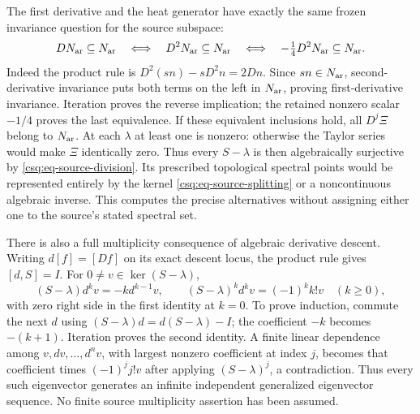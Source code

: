 The first derivative and the heat generator have exactly the same
frozen invariance question for the source subspace:
\begin{equation}\label{csq:eq-source-D-equivalence}
 DN_{\rm ar}\subseteq N_{\rm ar}
 \quad\Longleftrightarrow\quad D^2N_{\rm ar}\subseteq N_{\rm ar}
 \quad\Longleftrightarrow\quad -\tfrac14D^2N_{\rm ar}\subseteq N_{\rm ar}.
\end{equation}
Indeed the product rule is
$D^2(sn)-sD^2n=2Dn$. Since $sn\in N_{\rm ar}$, second-derivative
invariance puts both terms on the left in $N_{\rm ar}$, proving
first-derivative invariance. Iteration proves the reverse implication;
the retained nonzero scalar $-1/4$ proves the last equivalence.
If these equivalent inclusions hold, all $D^j\Xi$ belong to
$N_{\rm ar}$. At each $\lambda$ at least one is nonzero: otherwise
the Taylor series would make $\Xi$ identically zero. Thus every
$S-\lambda$ is then algebraically surjective by
\eqref{csq:eq-source-division}. Its prescribed topological spectral
points would be represented entirely by the kernel
\eqref{csq:eq-source-splitting} or a noncontinuous algebraic inverse.
This computes the precise alternatives without assigning either
one to the source's stated spectral set.

There is also a full multiplicity consequence of algebraic derivative
descent. Writing $d[f]=[Df]$ on its exact descent locus, the product
rule gives $[d,S]=I$. For $0\ne v\in\ker(S-\lambda)$,
\begin{equation}\label{csq:eq-source-weylladder}
 (S-\lambda)d^kv=-k d^{k-1}v,
 \qquad (S-\lambda)^kd^kv=(-1)^k k!v\quad(k\geq0),
\end{equation}
with zero right side in the first identity at $k=0$.
To prove induction, commute the next $d$ using
$(S-\lambda)d=d(S-\lambda)-I$; the coefficient $-k$ becomes
$-(k+1)$. Iteration proves the second identity. A finite linear
dependence among $v,dv,\ldots,d^nv$, with largest nonzero
coefficient at index $j$, becomes that coefficient times
$(-1)^j j!v$ after applying $(S-\lambda)^j$, a contradiction.
Thus every such eigenvector generates an infinite independent
generalized eigenvector sequence. No finite source multiplicity
assertion has been assumed.

